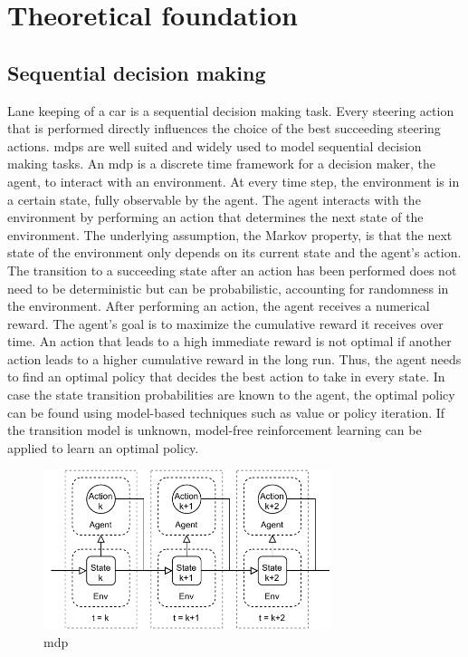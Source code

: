 \chapter{Theoretical foundation}
\label{sec:theory}

\section{Sequential decision making}

Lane keeping of a car is a sequential decision making task. Every steering action that is performed directly influences the choice of the best succeeding steering actions. \Glspl{mdp} are well suited and widely used to model sequential decision making tasks. An \gls{mdp} is a discrete time framework for a decision maker, the agent, to interact with an environment. At every time step, the environment is in a certain state, fully observable by the agent. The agent interacts with the environment by performing an action that determines the next state of the environment. The underlying assumption, the Markov property, is that the next state of the environment only depends on its current state and the agent's action. The transition to a succeeding state after an action has been performed does not need to be deterministic but can be probabilistic, accounting for randomness in the environment. After performing an action, the agent receives a numerical reward. The agent's goal is to maximize the cumulative reward it receives over time. An action that leads to a high immediate reward is not optimal if another action leads to a higher cumulative reward in the long run. Thus, the agent needs to find an optimal policy that decides the best action to take in every state. In case the state transition probabilities are known to the agent, the optimal policy can be found using model-based techniques such as value or policy iteration. If the transition model is unknown, model-free reinforcement learning can be applied to learn an optimal policy. %

\begin{figure}[htbp]
    \centering
    \includegraphics[width=0.75\textwidth]{figures/MDP.pdf}
    \caption{\acrfull{mdp}}
\end{figure}

